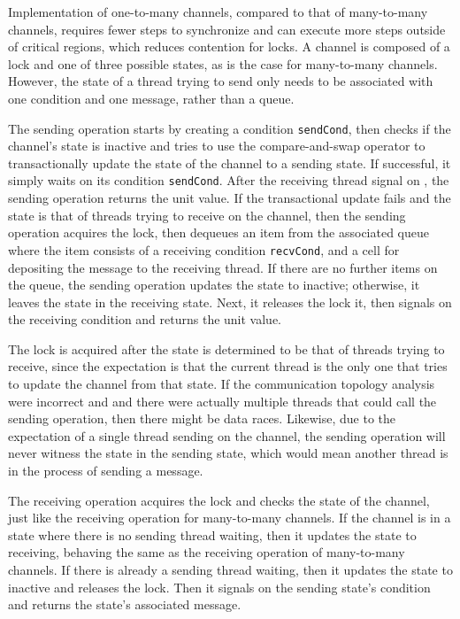 \documentclass[10pt]{article}
\begin{document}
Implementation of one-to-many channels, compared to that of many-to-many channels,
requires fewer
steps to synchronize and can execute more steps outside of critical regions, which reduces
contention for locks. A channel is composed of a lock and one of three possible states, as is
the case for many-to-many channels.  However, the state of a thread trying to send only needs
to be associated with one condition and one message, rather than a queue.  

The sending operation starts by creating a condition \lstinline{sendCond}, then checks
if the channel's state is inactive and tries to use the
compare-and-swap operator to transactionally update the state of
the channel to a sending state.
If successful, it simply waits on its condition \lstinline{sendCond}.
After the receiving thread signal on , the sending operation returns the unit value.
If the transactional update fails and the state is
that of threads trying to receive on the channel, then the sending operation acquires the lock,
then dequeues an item from the associated queue where the item consists of a receiving condition \lstinline{recvCond},
and a cell for depositing the message to the receiving thread.
If there are no further items on the queue, the sending operation updates the state to inactive; otherwise, it
leaves the state in the receiving state.
Next, it releases the lock it, then signals on the receiving condition and returns the unit value.

The lock is acquired after the state is determined to be that of
threads trying to receive, since the expectation is that the current thread is the only one
that tries to update the channel from that state.  If the communication topology analysis were
incorrect and and there were actually multiple threads that could call the sending operation,
then there might be data races.  Likewise, due to the expectation of a single thread
sending on the channel, the sending operation will never witness the state in the sending state,
which would mean another thread is in the process of sending a message.

The receiving operation acquires the lock and checks
the state of the channel, just like the receiving operation for many-to-many channels.
If the channel is in a state where there is no sending thread waiting,
then it updates the state to receiving, behaving the same as the receiving operation of many-to-many channels.
If there is already a sending thread waiting, then it updates the state to inactive and
releases the lock. Then it signals on the sending state's condition and returns the state's associated message.
\end{document}

